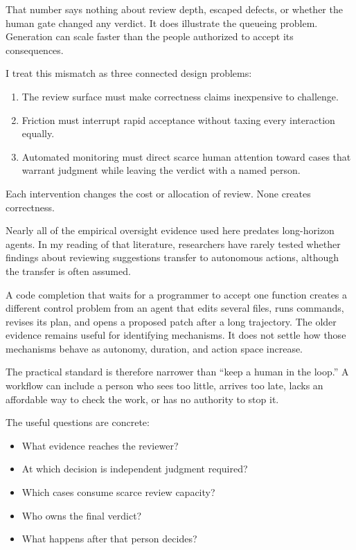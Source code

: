 That number says nothing about review depth, escaped defects, or whether the human gate changed any verdict. It does illustrate the queueing problem. Generation can scale faster than the people authorized to accept its consequences.

I treat this mismatch as three connected design problems:

\begin{enumerate}
\def\labelenumi{\arabic{enumi}.}
\tightlist
\item
  The review surface must make correctness claims inexpensive to challenge.
\item
  Friction must interrupt rapid acceptance without taxing every interaction equally.
\item
  Automated monitoring must direct scarce human attention toward cases that warrant judgment while leaving the verdict with a named person.
\end{enumerate}

Each intervention changes the cost or allocation of review. None creates correctness.

Nearly all of the empirical oversight evidence used here predates long-horizon agents. In my reading of that literature, researchers have rarely tested whether findings about reviewing suggestions transfer to autonomous actions, although the transfer is often assumed.

A code completion that waits for a programmer to accept one function creates a different control problem from an agent that edits several files, runs commands, revises its plan, and opens a proposed patch after a long trajectory. The older evidence remains useful for identifying mechanisms. It does not settle how those mechanisms behave as autonomy, duration, and action space increase.

The practical standard is therefore narrower than ``keep a human in the loop.'' A workflow can include a person who sees too little, arrives too late, lacks an affordable way to check the work, or has no authority to stop it.

The useful questions are concrete:

\begin{itemize}
\tightlist
\item
  What evidence reaches the reviewer?
\item
  At which decision is independent judgment required?
\item
  Which cases consume scarce review capacity?
\item
  Who owns the final verdict?
\item
  What happens after that person decides?
\end{itemize}

